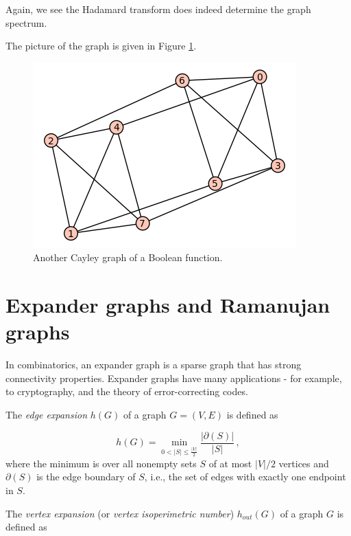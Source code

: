 Again, we see the Hadamard transform does indeed determine the graph spectrum.

The picture of the graph is given in Figure \ref{fig:distance_connectivity:bent-fcns-cayley-graphs2}.
 
\begin{figure}[!htbp]
\centering
{}
\includegraphics{image/distance-connectivity/bent-fcns-cayley-graphs2}
\caption{Another Cayley graph of a Boolean function.}
\label{fig:distance_connectivity:bent-fcns-cayley-graphs2}
\end{figure}
 





\section{Expander graphs and Ramanujan graphs}


In combinatorics, an expander graph is a sparse graph that has strong
connectivity properties.
Expander graphs have many applications - for example, to cryptography,
and the theory of error-correcting codes.

The {\it edge expansion} $h(G)$ of a graph
$G=(V,E)$ is defined as

\[
    h(G) = \min_{0 < |S| \le \frac{|V|}{2} } \frac{|\partial(S)|}{|S|}\,,
\]
where the minimum is over all nonempty sets $S$ of at most
$|V| / 2$ vertices and
$\partial(S)$ is the edge boundary of $S$, i.e., the set of
edges with exactly one endpoint in $S$.

The {\it vertex expansion} (or {\it vertex isoperimetric number})
$h_{out}(G)$ of a graph $G$ is defined as


